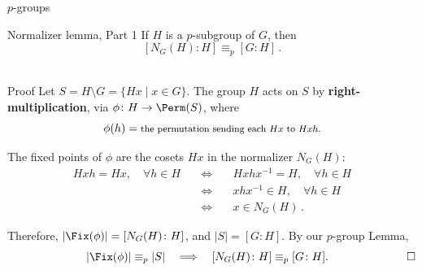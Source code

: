 \documentclass[8pt, handout]{beamer}
\newcommand{\Pause}{}      %
\begin{document}
\begin{frame}{$p$-groups} \medskip

  \begin{block}{Normalizer lemma, Part 1}
    If $H$ is a $p$-subgroup of $G$, then \vspace{-1mm}
    \[
    [N_G(H)\colon H]\equiv_p[G\colon H]\,.
    \]
    $\;$\vspace{-0.4cm}
  \end{block}

  \vspace{-1mm}

  \begin{exampleblock}{Proof}
    Let $S=H\!\setminus\!G=\{Hx\mid x\in G\}$. \Pause The group $H$
    acts on $S$ by \textbf{right-multiplication}, via $\phi\colon
    H\to\Perm(S)$, where
    \[
    \phi(h)=\mbox{\footnotesize the permutation sending each $Hx$ to
      $Hxh$.}
    \]
    
    \pause
    
    The {\color{xGreen}fixed points} of $\phi$ are the cosets $Hx$
    in the {\color{xGreen}normalizer $N_G(H)$}: \Pause\vspace{-2mm}
    \[
    \renewcommand{\arraystretch}{1.2}
    \begin{array}{lll}
      Hxh=Hx,\quad\forall h\in H\quad & \Longleftrightarrow\quad &
      Hxhx^{-1}=H,\quad\forall h\in H\Pause
      \\ & \Longleftrightarrow\quad & xhx^{-1}\in H,\quad\forall h\in H\,
      \Pause \\ & \Longleftrightarrow\quad & x\in N_G(H)\,.
    \end{array}
    \]

    \pause
    
    Therefore, $|\Fix(\phi)|=[N_G(H)\colon H]$, and
    $|S|=[G:H]$. \Pause By our $p$-group Lemma,
    \[
    \quad\qquad\qquad\qquad|\Fix(\phi)|\equiv_p|S|
    \quad\Longrightarrow\quad\Pause {[N_G(H)\colon H]}\equiv_p[G\colon H].
    \qquad\qquad\qquad\quad\Box
    \] \vspace{-4mm}
  \end{exampleblock}
  
\end{frame}

\end{document}
